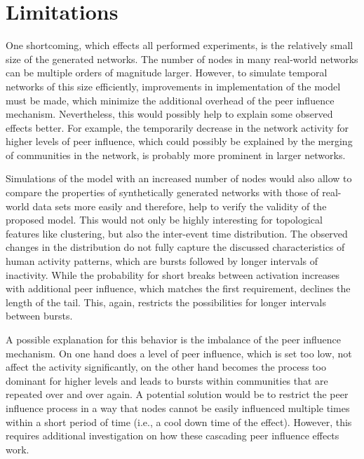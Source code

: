 

\section{Limitations}
\label{sec:limitations}

One shortcoming, which effects all performed experiments, is the relatively small size of the generated networks.
The number of nodes in many real-world networks can be multiple orders of magnitude larger.
However, to simulate temporal networks of this size efficiently, improvements in implementation of the model must be made, which minimize the additional overhead of the peer influence mechanism.
Nevertheless, this would possibly help to explain some observed effects better.
For example, the temporarily decrease in the network activity for higher levels of peer influence, which could possibly be explained by the merging of communities in the network, is probably more prominent in larger networks.

Simulations of the model with an increased number of nodes would also allow to compare the properties of synthetically generated networks with those of real-world data sets more easily and therefore, help to verify the validity of the proposed model.
This would not only be highly interesting for topological features like clustering, but also the inter-event time distribution.
The observed changes in the distribution do not fully capture the discussed characteristics of human activity patterns, which are bursts followed by longer intervals of inactivity.
While the probability for short breaks between activation increases with additional peer influence, which matches the first requirement, declines the length of the tail.
This, again, restricts the possibilities for longer intervals between bursts.

A possible explanation for this behavior is the imbalance of the peer influence mechanism.
On one hand does a level of peer influence, which is set too low, not affect the activity significantly, on the other hand becomes the process too dominant for higher levels and leads to bursts within communities that are repeated over and over again.
A potential solution would be to restrict the peer influence process in a way that nodes cannot be easily influenced multiple times within a short period of time (i.e., a cool down time of the effect).
However, this requires additional investigation on how these cascading peer influence effects work.


